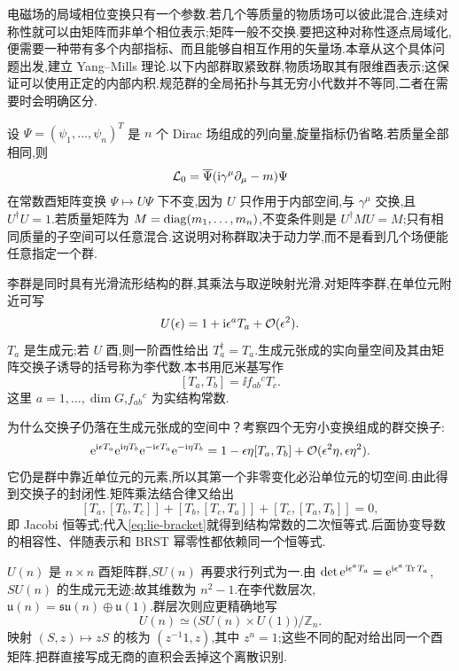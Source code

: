 \label{chap:nonabelian}

电磁场的局域相位变换只有一个参数.若几个等质量的物质场可以彼此混合,连续对称性就可以由矩阵而非单个相位表示;矩阵一般不交换.要把这种对称性逐点局域化,便需要一种带有多个内部指标、而且能够自相互作用的矢量场.本章从这个具体问题出发,建立 Yang--Mills 理论.以下内部群取紧致群,物质场取其有限维酉表示;这保证可以使用正定的内部内积.规范群的全局拓扑与其无穷小代数并不等同,二者在需要时会明确区分.

设 $\Psi=(\psi_1,\ldots,\psi_n)^T$ 是 $n$ 个 Dirac 场组成的列向量,旋量指标仍省略.若质量全部相同,则
\[
 \mathcal L_0=\overline\Psi(\mathrm i\gamma^\mu\partial_\mu-m)\Psi
\]
在常数酉矩阵变换 $\Psi\mapsto U\Psi$ 下不变,因为 $U$ 只作用于内部空间,与 $\gamma^\mu$ 交换,且 $U^\dagger U=1$.若质量矩阵为 $M=\operatorname{diag}(m_1,\ldots,m_n)$,不变条件则是 $U^\dagger MU=M$;只有相同质量的子空间可以任意混合.这说明对称群取决于动力学,而不是看到几个场便能任意指定一个群.

\begin{definition}[李群与生成元]
李群是同时具有光滑流形结构的群,其乘法与取逆映射光滑.对矩阵李群,在单位元附近可写
\[
 U(\epsilon)=1+\mathrm i\epsilon^aT_a+\mathcal O(\epsilon^2).
\]
$T_a$ 是生成元;若 $U$ 酉,则一阶酉性给出 $T_a^\dagger=T_a$.生成元张成的实向量空间及其由矩阵交换子诱导的括号称为李代数.本书用厄米基写作
\begin{equation}\label{eq:lie-bracket}
 [T_a,T_b]=\ii f_{ab}{}^cT_c.
\end{equation}
这里 $a=1,\ldots,\dim G$,$f_{ab}{}^c$ 为实结构常数.
\end{definition}

为什么交换子仍落在生成元张成的空间中？考察四个无穷小变换组成的群交换子:
\[
 \mathrm e^{\mathrm i\epsilon T_a}\mathrm e^{\mathrm i\eta T_b}
 \mathrm e^{-\mathrm i\epsilon T_a}\mathrm e^{-\mathrm i\eta T_b}
 =1-\epsilon\eta[T_a,T_b]+\mathcal O(\epsilon^2\eta,\epsilon\eta^2).
\]
它仍是群中靠近单位元的元素,所以其第一个非零变化必沿单位元的切空间.由此得到交换子的封闭性.矩阵乘法结合律又给出
\[
 [T_a,[T_b,T_c]]+[T_b,[T_c,T_a]]+[T_c,[T_a,T_b]]=0,
\]
即 Jacobi 恒等式;代入\eqref{eq:lie-bracket}就得到结构常数的二次恒等式.后面协变导数的相容性、伴随表示和 BRST 幂零性都依赖同一个恒等式.

$U(n)$ 是 $n\times n$ 酉矩阵群,$SU(n)$ 再要求行列式为一.由 $\det\mathrm e^{\mathrm i\epsilon^aT_a}=\mathrm e^{\mathrm i\epsilon^a\operatorname{Tr} T_a}$,$SU(n)$ 的生成元无迹;故其维数为 $n^2-1$.在李代数层次,$\mathfrak u(n)=\mathfrak{su}(n)\oplus\mathfrak u(1)$.群层次则应更精确地写
\[
 U(n)\simeq\bigl(SU(n)\times U(1)\bigr)/\mathbb Z_n.
\]
映射 $(S,z)\mapsto zS$ 的核为 $(z^{-1}1,z)$,其中 $z^n=1$;这些不同的配对给出同一个酉矩阵.把群直接写成无商的直积会丢掉这个离散识别.


